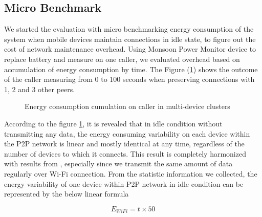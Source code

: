 \documentclass{sig-alternate}[10pt]
\begin{document}
\subsection{Micro Benchmark}
We started the evaluation with micro benchmarking energy consumption of the system when mobile devices maintain connections in idle state, to figure out the cost of network maintenance overhead. Using Monsoon Power Monitor device \cite{moosoon} to replace battery and measure on one caller, we evaluated overhead based on accumulation of energy consumption by time. The Figure (\ref{fig:microb_24}) shows the outcome of the caller measuring from 0 to 100 seconds when preserving connections with 1, 2 and 3 other peers. 

\begin{figure}
	\hspace*{-0.15cm}
	\caption{Energy consumption cumulation on caller in multi-device clusters}
	\label{fig:microb_24}
\end{figure}

According to the figure \ref{fig:microb_24}, it is revealed that in idle condition without transmitting any data, the energy consuming variability on each device within the P2P network is linear and mostly identical at any time, regardless of the number of devices to which it connects. This result is completely harmonized with results from \cite{wifi_energy}, especially since we transmit the same amount of data regularly over Wi-Fi connection. From the statistic information we collected, the energy variability of one device within P2P network in idle condition can be represented by the below linear formula

\begin{equation}
\label{eq:wifi_overload}
E_{WiFi} = t \times 50
\end{equation}
\end{document}

